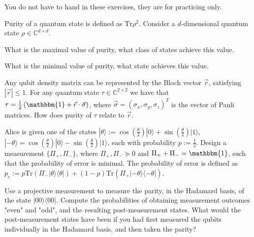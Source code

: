 \documentclass[a4paper,10pt,landscape,twocolumn]{scrartcl}
\newcommand{\ket}[1]{| #1 \rangle}
\newcommand{\proj}[1]{| #1 \rangle \langle #1 |}
\newcommand{\Tr}{\text{Tr}}
\begin{document}
\homeworkproblems

{\sffamily\noindent
You do not have to hand in these exercises, they are for practicing only. %
}


\begin{exercise}[Purity]
Purity of a quantum state is defined as $\Tr\rho^2$. Consider a $d$-dimensional quantum state $\rho\in \mathbb{C}^{d\times d}$.
\begin{subex}
What is the maximal value of purity, what class of states achieve this value.
\end{subex}

\begin{subex}
What is the minimal value of purity, what state achieves this value.
\end{subex}

\begin{subex}
Any qubit density matrix can be represented by the Bloch vector $\vec{r}$, satisfying $|\vec{r}|\leq 1$. For any quantum state $\tau\in \mathbb{C}^{2\times 2}$ we have that $\tau= \frac{1}{2}\left( \mathbbm{1} + \vec{r}\cdot \vec{\sigma} \right)$, where $\vec{\sigma}=(\sigma_x,\sigma_y,\sigma_z)^T$ is the vector of Pauli matrices. How does purity of $\tau$ relate to $\vec{r}$.
\end{subex}

\end{exercise}


\begin{exercise}
Alice is given one of the states $\ket{\theta}:=\cos\left(\frac{\theta}{2}\right)\ket{0}+\sin\left(\frac{\theta}{2}\right)\ket{1}$, $\ket{-\theta}=\cos\left(\frac{\theta}{2}\right)\ket{0}-\sin\left(\frac{\theta}{2}\right)\ket{1}$, each with probability $p:=\frac{1}{2}$. Design a measurement $\{ \Pi_{+},\Pi_{-}\}$, where $\Pi_{+},\Pi_{-}\succeq 0$ and $\Pi_{+}+\Pi_{-}= \mathbbm{1}$, such that the probability of error is minimal. The probability of error is defined as $p_e:= p\Tr(\Pi_{-}\proj{\theta})+(1-p)\Tr(\Pi_{+}\proj{-\theta})$.
\end{exercise}




\begin{exercise}
Use a projective measurement to measure the parity, in the Hadamard basis, of
the state $\proj{00}$. Compute the probabilities of obtaining measurement outcomes "even" and
"odd", and the resulting post-measurement states. What would the post-measurement states have
been if you had first measured the qubits individually in the Hadamard basis, and then taken the
parity?
\end{exercise}
\end{document}
